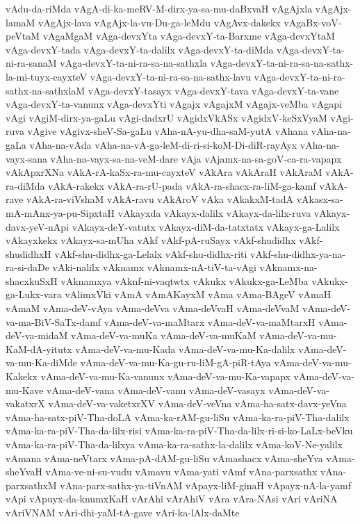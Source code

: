 {vAdu-da-riMda
vAgA-di-ka-meRV-M-dirx-ya-sa-mu-daBxvaH
vAgAjxla
vAgAjx-lamaM
vAgAjx-lava
vAgAjx-la-vu-Du-ga-leMdu
vAgAvx-dakekx
vAgaBx-voV-peVtaM
vAgaMgaM
vAga-devxYta
vAga-devxY-ta-Barxme
vAga-devxYtaM
vAga-devxY-tada
vAga-devxY-ta-dalilx
vAga-devxY-ta-diMda
vAga-devxY-ta-ni-ra-sanaM
vAga-devxY-ta-ni-ra-sa-na-sathxla
vAga-devxY-ta-ni-ra-sa-na-sathx-la-mi-tuyx-cayxteV
vAga-devxY-ta-ni-ra-sa-na-sathx-lavu
vAga-devxY-ta-ni-ra-sathx-na-sathxlaM
vAga-devxY-tasayx
vAga-devxY-tava
vAga-devxY-ta-vane
vAga-devxY-ta-vanunx
vAga-devxYti
vAgajx
vAgajxM
vAgajx-veMba
vAgapi
vAgi
vAgiM-dirx-ya-gaLu
vAgi-dadxrU
vAgidxVkASx
vAgidxV-keSxVyaM
vAgi-ruva
vAgive
vAgivx-sheV-Sa-gaLu
vAha-nA-yu-dha-saM-yutA
vAhana
vAha-na-gaLa
vAha-na-vAda
vAha-na-vA-ga-leM-di-ri-si-koM-Di-diR-rayAyx
vAha-na-vayx-sana
vAha-na-vayx-sa-na-veM-dare
vAja
vAjamx-na-sa-goV-ca-ra-vapapx
vAkApxrXNa
vAkA-rA-kaSx-ra-mu-cayxteV
vAkAra
vAkAraH
vAkAraM
vAkA-ra-diMda
vAkA-rakekx
vAkA-ra-rU-pada
vAkA-ra-shacx-ra-liM-ga-kamf
vAkA-rave
vAkA-ra-viVshaM
vAkA-ravu
vAkAroV
vAka
vAkakxM-tadA
vAkasx-sa-mA-mAnx-ya-pu-SipxtaH
vAkayxda
vAkayx-dalilx
vAkayx-da-lilx-ruva
vAkayx-davx-yeV-nApi
vAkayx-deY-vatutx
vAkayx-diM-da-tatxtatx
vAkayx-ga-Lalilx
vAkayxkekx
vAkayx-sa-mUha
vAkf
vAkf-pA-ruSayx
vAkf-shudidhx
vAkf-shudidhxH
vAkf-shu-didhx-ga-Lelalx
vAkf-shu-didhx-riti
vAkf-shu-didhx-ya-na-ra-si-daDe
vAki-nalilx
vAknamx
vAknamx-nA-tiV-ta-vAgi
vAknamx-na-shacxkuSxH
vAknamxya
vAknf-ni-vaqtwtx
vAkukx
vAkukx-ga-LeMba
vAkukx-ga-Lukx-vara
vAlimxVki
vAmA
vAmAKayxM
vAma
vAma-BAgeV
vAmaH
vAmaM
vAma-deV-vAya
vAma-deVva
vAma-deVvaH
vAma-deVvaM
vAma-deV-va-ma-BiV-SaTx-damf
vAma-deV-va-maMtarx
vAma-deV-va-maMtarxH
vAma-deV-va-midaM
vAma-deV-va-muKa
vAma-deV-va-muKaM
vAma-deV-va-mu-KaM-dA-yitutx
vAma-deV-va-mu-Kada
vAma-deV-va-mu-Ka-dalilx
vAma-deV-va-mu-Ka-diMde
vAma-deV-va-mu-Ka-gu-ru-liM-gA-piR-tAya
vAma-deV-va-mu-Kakekx
vAma-deV-va-mu-Ka-vanunx
vAma-deV-va-mu-Ka-vapapx
vAma-deV-va-mu-Kave
vAma-deV-vana
vAma-deV-vanu
vAma-deV-vasayx
vAma-deV-va-vakatxrX
vAma-deV-va-vaketxrXV
vAma-deV-veVna
vAma-ha-satx-davx-yeVna
vAma-ha-satx-piV-Tha-doLA
vAma-ka-rAM-gu-liSu
vAma-ka-ra-piV-Tha-dalilx
vAma-ka-ra-piV-Tha-da-lilx-risi
vAma-ka-ra-piV-Tha-da-lilx-ri-si-ko-LaLx-beVku
vAma-ka-ra-piV-Tha-da-lilxya
vAma-ka-ra-sathx-la-dalilx
vAma-koV-Ne-yalilx
vAmana
vAma-neVtarx
vAma-pA-dAM-gu-liSu
vAmashacx
vAma-sheYva
vAma-sheYvaH
vAma-ve-ni-su-vudu
vAmavu
vAma-yati
vAmf
vAna-parxsathx
vAna-parxsathxM
vAna-parx-sathx-ya-tiVnAM
vApayx-liM-ginaH
vApayx-nA-la-yamf
vApi
vApuyx-da-knumxKaH
vArAhi
vArAhiV
vAra
vAra-NAsi
vAri
vAriNA
vAriVNAM
vAri-dhi-yaM-tA-gave
vAri-ka-lAlx-daMte
}
